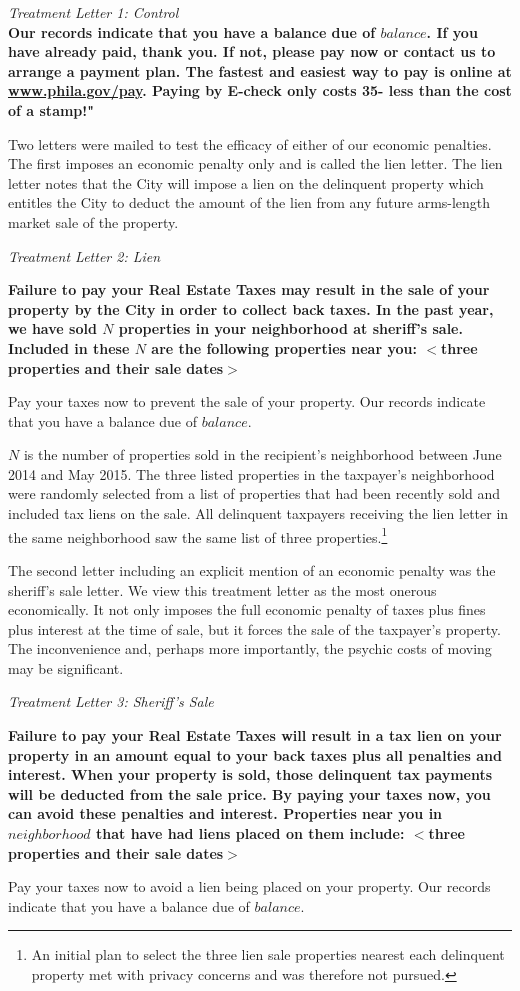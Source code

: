 \documentclass[12pt]{article}
\begin{document}
{\it Treatment Letter 1: Control } \\ {\bf Our records indicate that
  you have a balance due of $balance$.  If you have already paid,
  thank you. If not, please pay now or contact us to arrange a payment
  plan. The fastest and easiest way to pay is online at
  \underline{www.phila.gov/pay}. Paying by E-check only costs 35\textcent -
  less than the cost of a stamp!"}

Two letters were mailed to test the efficacy of either of our 
economic penalties.  The first imposes an economic penalty only and is
called the lien letter.  The lien letter notes that the City will
impose a lien on the delinquent property which entitles the City to
deduct the amount of the lien from any future arms-length market sale
of the property.
        
{\it Treatment Letter 2: Lien } \\ {\bf Failure to pay your Real
  Estate Taxes may result in the sale of your property by the City in
  order to collect back taxes. In the past year, we have sold $N$
  properties in your neighborhood at sheriff's sale. Included in these
  $N$ are the following properties near you: $<$three properties and
  their sale dates$>$

  Pay your taxes now to prevent the sale of your property.  Our
  records indicate that you have a balance due of $balance$.}

$N$ is the number of properties sold in the recipient's neighborhood
between June 2014 and May 2015. The three listed properties in the
taxpayer's neighborhood were randomly selected from a list of
properties that had been recently sold and included tax liens on the
sale.  All delinquent taxpayers receiving the lien letter in the same
neighborhood saw the same list of three properties.\footnote{An
  initial plan to select the three lien sale properties nearest each
  delinquent property met with privacy concerns and was therefore not
  pursued.}

The second letter including an explicit mention of an economic penalty
was the sheriff's sale letter.  We view this treatment letter as the
most onerous economically.  It not only imposes the full economic
penalty of taxes plus fines plus interest at the time of sale, but it
forces the sale of the taxpayer's property.  The inconvenience and,
perhaps more importantly, the psychic costs of moving may be
significant.  
  
{\it Treatment Letter 3: Sheriff's Sale} \\ {\bf Failure to pay your
  Real Estate Taxes will result in a tax lien on your property in an
  amount equal to your back taxes plus all penalties and
  interest. When your property is sold, those delinquent tax payments
  will be deducted from the sale price. By paying your taxes now, you
  can avoid these penalties and interest. Properties near you in
  $neighborhood$ that have had liens placed on them include: $<$three
  properties and their sale dates$>$

  Pay your taxes now to avoid a lien being placed on your property.
  Our records indicate that you have a balance due of $balance$.}
  
\end{document}
